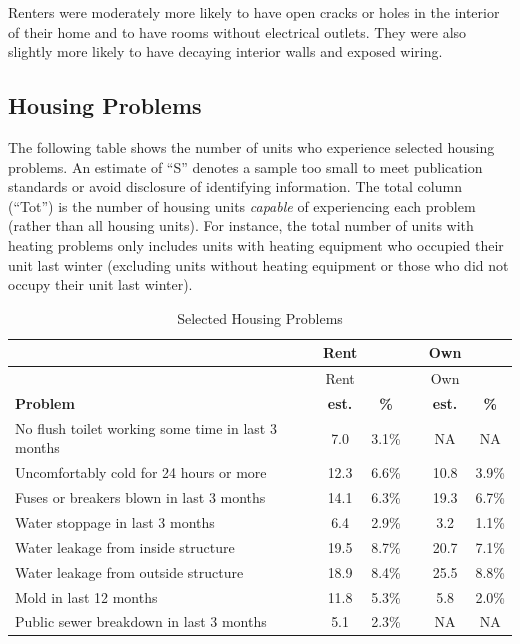 \documentclass[
  openany]{book}
\begin{document}
Renters were moderately more likely to have open cracks or holes in the interior of their home and to have rooms without electrical outlets. They were also slightly more likely to have decaying interior walls and exposed wiring.

\hypertarget{housing-problems}{%
\subsection{Housing Problems}\label{housing-problems}}

The following table shows the number of units who experience selected housing problems. An estimate of ``S'' denotes a sample too small to meet publication standards or avoid disclosure of identifying information. The total column (``Tot'') is the number of housing units \emph{capable} of experiencing each problem (rather than all housing units). For instance, the total number of units with heating problems only includes units with heating equipment who occupied their unit last winter (excluding units without heating equipment or those who did not occupy their unit last winter).

\begin{longtable}[]{@{}lccccc@{}}
\caption{Selected Housing Problems}\tabularnewline
\toprule
& Rent & & & Own & \\
\midrule
\endfirsthead
\toprule
& Rent & & & Own & \\
\midrule
\endhead
\textbf{Problem} & \textbf{est.} & \textbf{\%} & & \textbf{est.} & \textbf{\%} \\
No flush toilet working some time in last 3 months & 7.0 & 3.1\% & & NA & NA \\
Uncomfortably cold for 24 hours or more & 12.3 & 6.6\% & & 10.8 & 3.9\% \\
Fuses or breakers blown in last 3 months & 14.1 & 6.3\% & & 19.3 & 6.7\% \\
Water stoppage in last 3 months & 6.4 & 2.9\% & & 3.2 & 1.1\% \\
Water leakage from inside structure & 19.5 & 8.7\% & & 20.7 & 7.1\% \\
Water leakage from outside structure & 18.9 & 8.4\% & & 25.5 & 8.8\% \\
Mold in last 12 months & 11.8 & 5.3\% & & 5.8 & 2.0\% \\
Public sewer breakdown in last 3 months & 5.1 & 2.3\% & & NA & NA \\
\bottomrule
\end{longtable}
\end{document}
